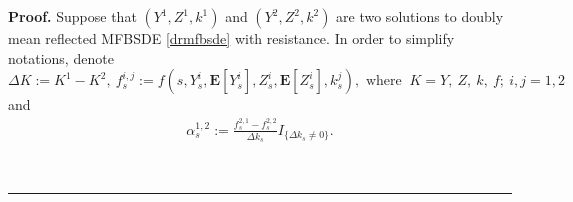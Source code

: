 \documentclass[10pt]{article}%
\numberwithin{equation}{section}
\newenvironment{proof}[1][Proof]{\noindent \textbf{#1.} }{\  \rule{0.5em}{0.5em}}
\begin{document}
\begin{proof}
    Suppose that $(Y^1,Z^1,k^1)$ and $(Y^2,Z^2,k^2)$ are two solutions to doubly mean reflected MFBSDE  \eqref{drmfbsde} with resistance. In order to simplify notations, denote
    $$\Delta K:=K^1-K^2,  \  f^{i,j}_s:=f(s,Y_s^i,\mathbf{E}[Y_s^i],Z_s^i,\mathbf{E}[Z_s^i],k_s^j),\text{ where }\ K= Y,\ Z,\ k,\ f;\ i,j=1,2$$
    and 
    \begin{equation*}
     \begin{split}
         \alpha^{1,2}_s:=\frac{f^{2,1}_s-f^{2,2}_s}{\Delta k_s} I_{\{\Delta k_s\neq 0\}}. %
         \end{split}   
    \end{equation*}
    

\end{proof}
\end{document}
